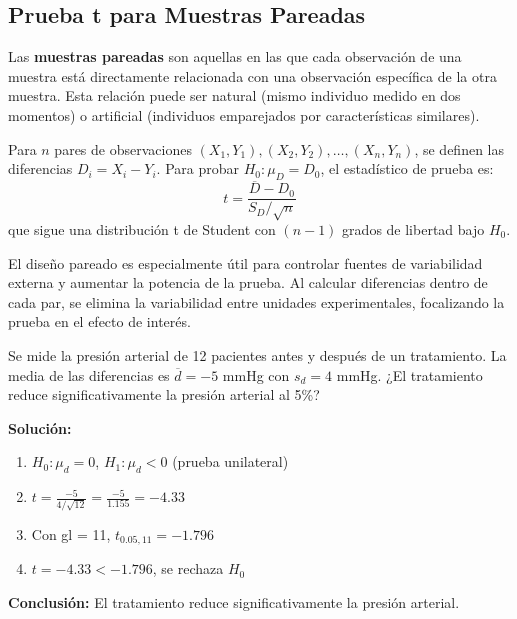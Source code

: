 \subsection{Prueba t para Muestras Pareadas}

\begin{definition}
Las \textbf{muestras pareadas} son aquellas en las que cada observación de una muestra está directamente relacionada con una observación específica de la otra muestra. Esta relación puede ser natural (mismo individuo medido en dos momentos) o artificial (individuos emparejados por características similares).
\end{definition}

\begin{theorem}
Para $n$ pares de observaciones $(X_1, Y_1), (X_2, Y_2), \ldots, (X_n, Y_n)$, se definen las diferencias $D_i = X_i - Y_i$. Para probar $H_0: \mu_D = D_0$, el estadístico de prueba es:
\[
t = \frac{\overline{D} - D_0}{S_D/\sqrt{n}}
\]
que sigue una distribución t de Student con $(n-1)$ grados de libertad bajo $H_0$.
\end{theorem}

\begin{remark}
El diseño pareado es especialmente útil para controlar fuentes de variabilidad externa y aumentar la potencia de la prueba. Al calcular diferencias dentro de cada par, se elimina la variabilidad entre unidades experimentales, focalizando la prueba en el efecto de interés.
\end{remark}

\begin{example}
Se mide la presión arterial de 12 pacientes antes y después de un tratamiento. La media de las diferencias es $\overline{d} = -5$ mmHg con $s_d = 4$ mmHg. ¿El tratamiento reduce significativamente la presión arterial al 5\%?

\textbf{Solución:}
\begin{enumerate}
    \item $H_0: \mu_d = 0$, $H_1: \mu_d < 0$ (prueba unilateral)
    \item $t = \frac{-5}{4/\sqrt{12}} = \frac{-5}{1.155} = -4.33$
    \item Con gl = 11, $t_{0.05,11} = -1.796$
    \item $t = -4.33 < -1.796$, se rechaza $H_0$
\end{enumerate}
\textbf{Conclusión:} El tratamiento reduce significativamente la presión arterial.
\end{example}

